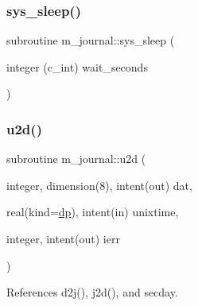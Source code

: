 \subsubsection{\texorpdfstring{sys\+\_\+sleep()}{sys\_sleep()}}
{\footnotesize\ttfamily subroutine m\+\_\+journal\+::sys\+\_\+sleep (\begin{DoxyParamCaption}\item[{integer (c\+\_\+int)}]{wait\+\_\+seconds }\end{DoxyParamCaption})\hspace{0.3cm}{\ttfamily [private]}}

\mbox{\label{namespacem__journal_a9521857f9c0a6ef8c85edcf9a3af1b07}} 
\subsubsection{\texorpdfstring{u2d()}{u2d()}}
{\footnotesize\ttfamily subroutine m\+\_\+journal\+::u2d (\begin{DoxyParamCaption}\item[{integer, dimension(8), intent(out)}]{dat,  }\item[{real(kind=\mbox{\hyperlink{namespacem__journal_aaae0522a70bb76a85ea800670d5fec5f}{dp}}), intent(in)}]{unixtime,  }\item[{integer, intent(out)}]{ierr }\end{DoxyParamCaption})\hspace{0.3cm}{\ttfamily [private]}}



References d2j(), j2d(), and secday.


